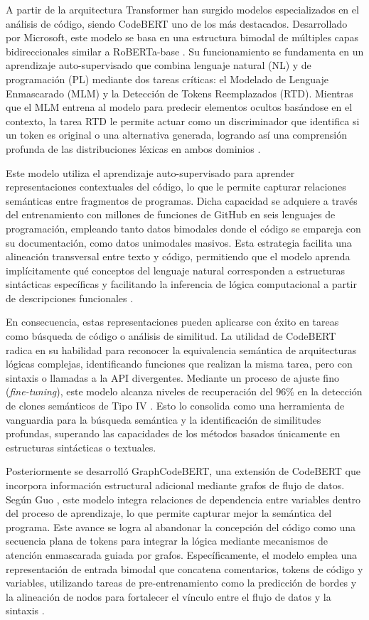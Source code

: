 A partir de la arquitectura Transformer han surgido modelos especializados en el análisis de código, siendo CodeBERT uno de los más destacados. Desarrollado por Microsoft, este modelo se basa en una estructura bimodal de múltiples capas bidireccionales similar a RoBERTa-base \cite{Feng2020CodeBERT}. Su funcionamiento se fundamenta en un aprendizaje auto-supervisado que combina lenguaje natural (NL) y de programación (PL) mediante dos tareas críticas: el Modelado de Lenguaje Enmascarado (MLM) y la Detección de Tokens Reemplazados (RTD). Mientras que el MLM entrena al modelo para predecir elementos ocultos basándose en el contexto, la tarea RTD le permite actuar como un discriminador que identifica si un token es original o una alternativa generada, logrando así una comprensión profunda de las distribuciones léxicas en ambos dominios \cite{Feng2020CodeBERT}.

Este modelo utiliza el aprendizaje auto-supervisado para aprender representaciones contextuales del código, lo que le permite capturar relaciones semánticas entre fragmentos de programas. Dicha capacidad se adquiere a través del entrenamiento con millones de funciones de GitHub en seis lenguajes de programación, empleando tanto datos bimodales donde el código se empareja con su documentación, como datos unimodales masivos. Esta estrategia facilita una alineación transversal entre texto y código, permitiendo que el modelo aprenda implícitamente qué conceptos del lenguaje natural corresponden a estructuras sintácticas específicas y facilitando la inferencia de lógica computacional a partir de descripciones funcionales \cite{Feng2020CodeBERT}.

En consecuencia, estas representaciones pueden aplicarse con éxito en tareas como búsqueda de código o análisis de similitud. La utilidad de CodeBERT radica en su habilidad para reconocer la equivalencia semántica de arquitecturas lógicas complejas, identificando funciones que realizan la misma tarea, pero con sintaxis o llamadas a la API divergentes. Mediante un proceso de ajuste fino (\textit{fine-tuning}), este modelo alcanza niveles de recuperación del 96\% en la detección de clones semánticos de Tipo IV \cite{ReplicationCodeBERT2022}. Esto lo consolida como una herramienta de vanguardia para la búsqueda semántica y la identificación de similitudes profundas, superando las capacidades de los métodos basados únicamente en estructuras sintácticas o textuales.

Posteriormente se desarrolló GraphCodeBERT, una extensión de CodeBERT que incorpora información estructural adicional mediante grafos de flujo de datos. Según Guo \cite{Guo2021GraphCodeBERT}, este modelo integra relaciones de dependencia entre variables dentro del proceso de aprendizaje, lo que permite capturar mejor la semántica del programa. Este avance se logra al abandonar la concepción del código como una secuencia plana de tokens para integrar la lógica mediante mecanismos de atención enmascarada guiada por grafos. Específicamente, el modelo emplea una representación de entrada bimodal que concatena comentarios, tokens de código y variables, utilizando tareas de pre-entrenamiento como la predicción de bordes y la alineación de nodos para fortalecer el vínculo entre el flujo de datos y la sintaxis \cite{Guo2021GraphCodeBERT}.

